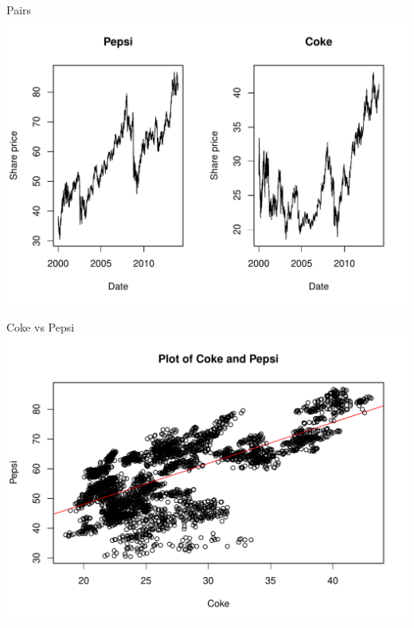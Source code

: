 \documentclass[14pt,xcolor=pdftex,dvipsnames,table]{beamer}\usepackage{graphicx, color}
\makeatletter
\def\maxwidth{ %
  \ifdim\Gin@nat@width>\linewidth
    \linewidth
  \else
    \Gin@nat@width
  \fi
}
\newenvironment{knitrout}{}{} %
\makeatother
\begin{document}
\begin{frame}{Pairs}
\begin{knitrout}
\color{fgcolor}
\includegraphics[width=\maxwidth]{figure/Coke} 

\end{knitrout}

\end{frame}

\begin{frame}{Coke vs Pepsi}
\begin{knitrout}
\color{fgcolor}
\includegraphics[width=\maxwidth]{figure/Coke2} 

\end{knitrout}

\end{frame}
\end{document}
